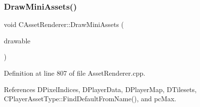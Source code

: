 \subsubsection{\texorpdfstring{Draw\+Mini\+Assets()}{DrawMiniAssets()}}
{\footnotesize\ttfamily void C\+Asset\+Renderer\+::\+Draw\+Mini\+Assets (\begin{DoxyParamCaption}\item[{Gdk\+Drawable $\ast$}]{drawable }\end{DoxyParamCaption})}



Definition at line 807 of file Asset\+Renderer.\+cpp.



References D\+Pixel\+Indices, D\+Player\+Data, D\+Player\+Map, D\+Tilesets, C\+Player\+Asset\+Type\+::\+Find\+Default\+From\+Name(), and pc\+Max.



